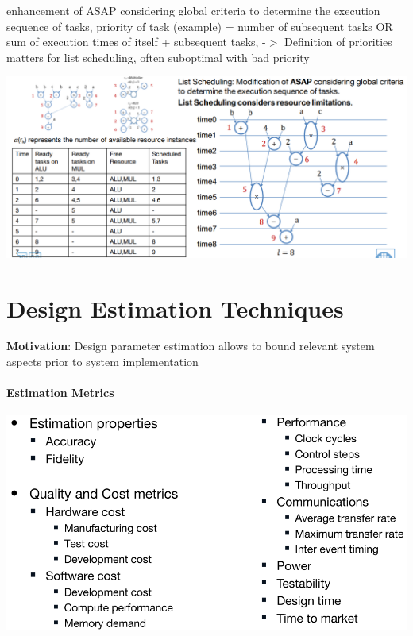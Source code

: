 \documentclass[english]{latex4ei/latex4ei_sheet}
\begin{document}
enhancement of ASAP considering global criteria to determine the execution sequence of tasks, priority of task (example) = number of subsequent tasks OR sum of execution times of itself + subsequent tasks, -$>$ Definition of priorities matters for list scheduling, often suboptimal with bad priority

\begin{center}
  \centering
  \includegraphics[width=\linewidth]{assets/ListSchedulingTut.png}
  \label{fig:listschedulingtut}
\end{center}

\section{Design Estimation Techniques}

\textbf{Motivation}: Design parameter estimation allows to bound
relevant system aspects prior to system implementation

\paragraph{Estimation Metrics}

\begin{center}
  \includegraphics[width=0.8\linewidth]{assets/EstimationMetrics.png}
  \label{fig:estimationmetrics}
\end{center}
\end{document}
